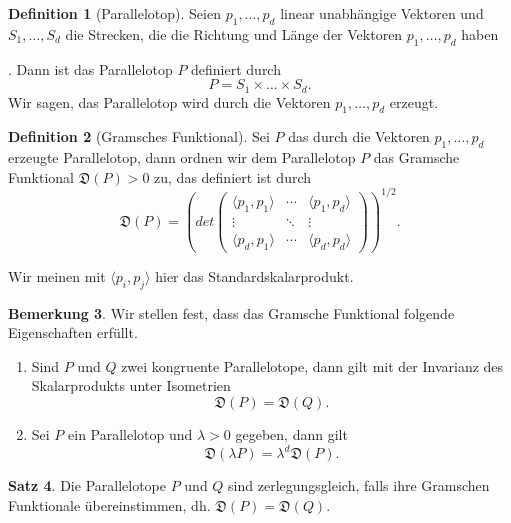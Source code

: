 \documentclass[11pt,titlepage]{article}
\theoremstyle{definition}
\newtheorem{theorem}{Satz}[section]
\newtheorem{definition}[theorem]{Definition}
\newtheorem{remark}[theorem]{Bemerkung}
\theoremstyle{remark}
\begin{document}
	
	\begin{definition}[Parallelotop]
		Seien $p_1,\ldots,p_d$ linear unabhängige Vektoren und $S_1,\ldots,S_d$ 
		die Strecken, die die Richtung und Länge der Vektoren $p_1,\ldots,p_d$ 
		haben
		
		
		. Dann ist das Parallelotop $P$ definiert durch 
		\[P=S_1\times\ldots\times S_d.\]
		Wir sagen, das Parallelotop wird durch die Vektoren $p_1,\ldots,p_d$ 
		erzeugt.
	\end{definition}
	
	\begin{definition}[Gramsches Funktional]
		Sei $P$ das durch die Vektoren $p_1,\ldots,p_d$ 
		erzeugte Parallelotop, dann ordnen wir dem Parallelotop $P$ das 
		Gramsche Funktional $\mathfrak{D}(P)>0$ zu, das definiert ist durch
		\[\mathfrak{D}(P)=\left(det \begin{pmatrix}
		\langle p_1,p_1\rangle & \cdots &\langle p_1,p_d\rangle \\
		\vdots & \ddots & \vdots \\
		\langle p_d,p_1 \rangle & \cdots & \langle p_d,p_d \rangle
		\end{pmatrix}\right)^{1/2}.\]
	\end{definition}
	
	Wir meinen mit $\langle p_i,p_j\rangle$ hier das Standardskalarprodukt. 
	
	\begin{remark} \label{bem:gramfunk}
		Wir stellen fest, dass das Gramsche Funktional folgende Eigenschaften 
		erfüllt.
		\begin{enumerate}
			\item Sind $P$ und $Q$ zwei kongruente Parallelotope, dann gilt mit 
			der Invarianz des Skalarprodukts unter Isometrien
			\[\mathfrak{D}(P)=\mathfrak{D}(Q).\]
			\item Sei $P$ ein Parallelotop und $\lambda>0$ gegeben, dann gilt 
			\[\mathfrak{D}(\lambda P)=\lambda^d \mathfrak{D}(P).\]
		\end{enumerate}
	\end{remark}
	
	\begin{theorem} \label{thm:zerlgram}
		Die Parallelotope $P$ und $Q$ sind zerlegungsgleich, falls ihre 
		Gramschen Funktionale übereinstimmen, dh. $\mathfrak{D}(P)=\mathfrak{D}(Q)$.
	\end{theorem}
	
\end{document}
